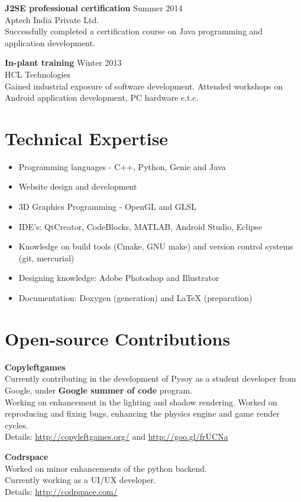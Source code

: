 \documentclass[margin]{res}
\begin{document}
\begin{resume}
	{\bf J2SE professional certification} \hfill Summer  2014 
	\\Aptech India Private Ltd.
	\\Successfully completed a certification course on Java programming and application development.

 {\bf In-plant training} \hfill Winter 2013 
 \\HCL Technologies
 \\Gained industrial exposure of software development. Attended workshops on Android application development, PC hardware e.t.c.

\section{Technical Expertise}
\begin{itemize}
	\item Programming languages - C++, Python, Genie and Java
	\item Website design and development%
	\item 3D Graphics Programming - OpenGL and GLSL %
	\item IDE’s: QtCreator, CodeBlocks, MATLAB, Android Studio, Eclipse
	\item Knowledge on build tools (Cmake, GNU make) and version control systems (git, mercurial)
	\item Designing knowledge: Adobe Photoshop and Illustrator
	\item Documentation: Doxygen (generation) and LaTeX (preparation)
\end{itemize}


\section{Open-source Contributions}
{\bf Copyleftgames} \\ Currently contributing in the development of Pysoy as a student developer from Google, under {\bf Google summer of code} program. \\ Working on enhancement in the lighting and shadow rendering. Worked on reproducing and fixing bugs, enhancing the physics engine and game render cycles. \\Details: \underline{http://copyleftgames.org/} and \underline{http://goo.gl/frUCNa}

{\bf Codrspace} \\ Worked on minor enhancements of the python backend.\\ Currently working as a UI/UX developer.  \\Details: \underline{http://codrspace.com/}



\end{resume}
\end{document}
